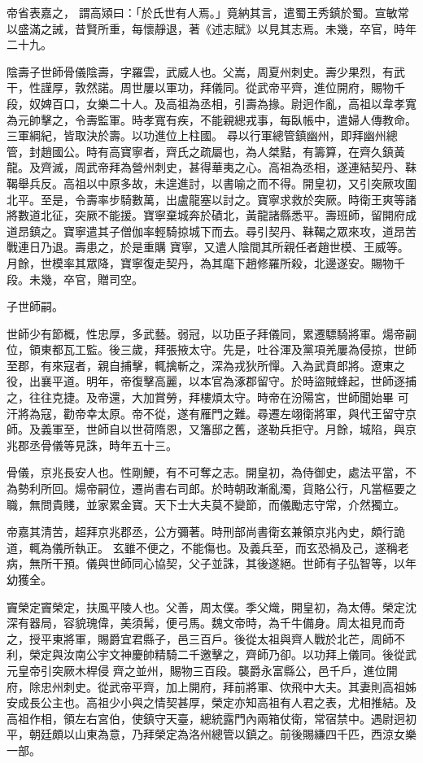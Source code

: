 \begin{pinyinscope}
 帝省表嘉之，
 謂高熲曰：「於氏世有人焉。」竟納其言，遣蜀王秀鎮於蜀。宣敏常以盛滿之誡，昔賢所重，每懷靜退，著《述志賦》以見其志焉。未幾，卒官，時年二十九。



 陰壽子世師骨儀陰壽，字羅雲，武威人也。父嵩，周夏州刺史。壽少果烈，有武干，性謹厚，敦然諾。周世屢以軍功，拜儀同。從武帝平齊，進位開府，賜物千段，奴婢百口，女樂二十人。及高祖為丞相，引壽為掾。尉迥作亂，高祖以韋孝寬為元帥擊之，令壽監軍。時孝寬有疾，不能親總戎事，每臥帳中，遣婦人傳教命。三軍綱紀，皆取決於壽。以功進位上柱國。
 尋以行軍總管鎮幽州，即拜幽州總管，封趙國公。時有高寶寧者，齊氏之疏屬也，為人桀黠，有籌算，在齊久鎮黃龍。及齊滅，周武帝拜為營州刺史，甚得華夷之心。高祖為丞相，遂連結契丹、靺鞨舉兵反。高祖以中原多故，未遑進討，以書喻之而不得。開皇初，又引突厥攻圍北平。至是，令壽率步騎數萬，出盧龍塞以討之。寶寧求救於突厥。時衛王爽等諸將數道北征，突厥不能援。寶寧棄城奔於磧北，黃龍諸縣悉平。壽班師，留開府成道昂鎮之。寶寧遣其子僧伽率輕騎掠城下而去。尋引契丹、靺鞨之眾來攻，道昂苦戰連日乃退。壽患之，於是重購
 寶寧，又遣人陰間其所親任者趙世模、王威等。月餘，世模率其眾降，寶寧復走契丹，為其麾下趙修羅所殺，北邊遂安。賜物千段。未幾，卒官，贈司空。



 子世師嗣。



 世師少有節概，性忠厚，多武藝。弱冠，以功臣子拜儀同，累遷驃騎將軍。煬帝嗣位，領東都瓦工監。後三歲，拜張掖太守。先是，吐谷渾及黨項羌屢為侵掠，世師至郡，有來寇者，親自捕擊，輒擒斬之，深為戎狄所憚。入為武賁郎將。遼東之役，出襄平道。明年，帝復擊高麗，以本官為涿郡留守。於時盜賊蜂起，世師逐捕之，往往克捷。及帝還，大加賞勞，拜樓煩太守。時帝在汾陽宮，世師聞始畢
 可汗將為寇，勸帝幸太原。帝不從，遂有雁門之難。尋遷左翊衛將軍，與代王留守京師。及義軍至，世師自以世荷隋恩，又籓邸之舊，遂勒兵拒守。月餘，城陷，與京兆郡丞骨儀等見誅，時年五十三。



 骨儀，京兆長安人也。性剛鯁，有不可奪之志。開皇初，為侍御史，處法平當，不為勢利所回。煬帝嗣位，遷尚書右司郎。於時朝政漸亂濁，貨賂公行，凡當樞要之職，無問貴賤，並家累金寶。天下士大夫莫不變節，而儀勵志守常，介然獨立。



 帝嘉其清苦，超拜京兆郡丞，公方彌著。時刑部尚書衛玄兼領京兆內史，頗行詭道，輒為儀所執正。
 玄雖不便之，不能傷也。及義兵至，而玄恐禍及己，遂稱老病，無所干預。儀與世師同心協契，父子並誅，其後遂絕。世師有子弘智等，以年幼獲全。



 竇榮定竇榮定，扶風平陵人也。父善，周太僕。季父熾，開皇初，為太傅。榮定沈深有器局，容貌瑰偉，美須髯，便弓馬。魏文帝時，為千牛備身。周太祖見而奇之，授平東將軍，賜爵宜君縣子，邑三百戶。後從太祖與齊人戰於北芒，周師不利，榮定與汝南公宇文神慶帥精騎二千邀擊之，齊師乃卻。以功拜上儀同。後從武元皇帝引突厥木桿侵
 齊之並州，賜物三百段。襲爵永富縣公，邑千戶，進位開府，除忠州刺史。從武帝平齊，加上開府，拜前將軍、佽飛中大夫。其妻則高祖姊安成長公主也。高祖少小與之情契甚厚，榮定亦知高祖有人君之表，尤相推結。及高祖作相，領左右宮伯，使鎮守天臺，總統露門內兩箱仗衛，常宿禁中。遇尉迥初平，朝廷頗以山東為意，乃拜榮定為洛州總管以鎮之。前後賜縑四千匹，西涼女樂一部。




\end{pinyinscope}
